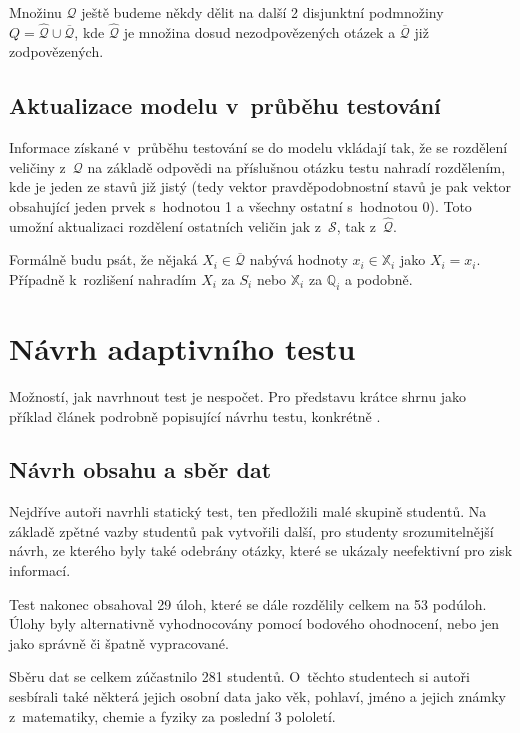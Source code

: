 \documentclass[a4paper,twoside,12pt]{scrbook}
\begin{document}
Množinu $\mathcal{Q}$ ještě budeme někdy dělit na další 2 disjunktní podmnožiny $Q = \widehat{\mathcal{Q}} \cup \overline{\mathcal{Q}}$, kde $\widehat{\mathcal{Q}}$ je množina dosud nezodpovězených otázek a $\overline{\mathcal{Q}}$ již zodpovězených.

\subsection{Aktualizace modelu v~průběhu testování}
Informace získané v~průběhu testování se do modelu vkládají tak, že se rozdělení veličiny z~$\mathcal{Q}$ na základě odpovědi na příslušnou otázku testu nahradí rozdělením, kde je jeden ze stavů již jistý (tedy vektor pravděpodobnostní stavů je pak vektor obsahující jeden prvek s~hodnotou 1 a všechny ostatní s~hodnotou 0). Toto umožní aktualizaci rozdělení ostatních veličin jak z~$\mathcal{S}$, tak z~$\widehat{\mathcal{Q}}$.

Formálně budu psát, že nějaká $X_i \in \overline{\mathcal{Q}}$ nabývá hodnoty $x_i \in \mathbb{X}_i$ jako $X_i = x_i$. Případně k~rozlišení nahradím $X_i$ za $S_i$ nebo $\mathbb{X}_i$ za $\mathbb{Q}_i$ a podobně.


\section{Návrh adaptivního testu}
\label{sec:test_design}
Možností, jak navrhnout test je nespočet. Pro představu krátce shrnu jako příklad článek podrobně popisující návrhu testu, konkrétně \cite{vomlel_plajner2015}.

\subsection{Návrh obsahu a sběr dat}
Nejdříve autoři navrhli statický test, ten předložili malé skupině studentů. Na základě zpětné vazby studentů pak vytvořili další, pro studenty srozumitelnější návrh, ze kterého byly také odebrány otázky, které se ukázaly neefektivní pro zisk informací.

Test nakonec obsahoval 29 úloh, které se dále rozdělily celkem na 53 podúloh. Úlohy byly alternativně vyhodnocovány pomocí bodového ohodnocení, nebo jen jako správně či špatně vypracované.

Sběru dat se celkem zúčastnilo 281 studentů. O~těchto studentech si autoři sesbírali také některá jejich osobní data jako věk, pohlaví, jméno a jejich známky z~matematiky, chemie a fyziky za poslední 3 pololetí.
\end{document}
